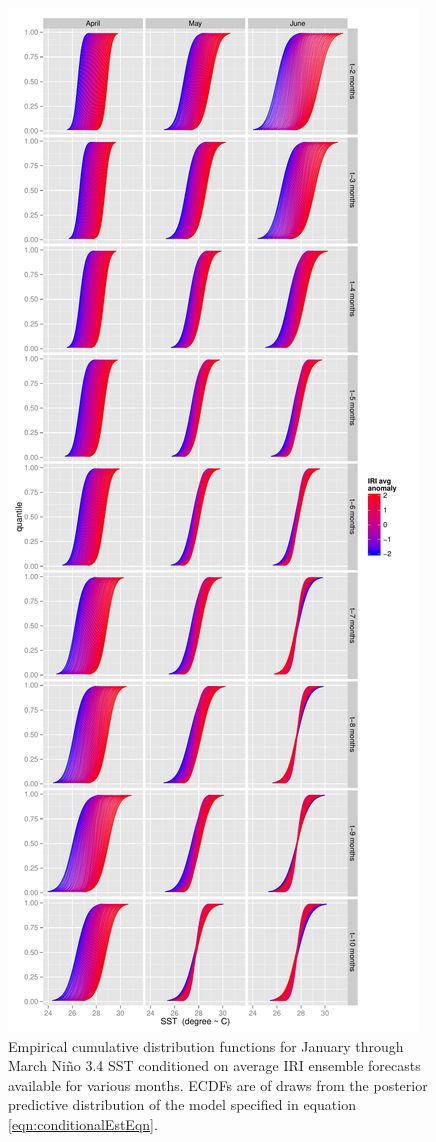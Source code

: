 \documentclass[authoryear]{article}
\begin{document}
\begin{figure}[!htbp]
  \includegraphics[width=\linewidth]{Pricingfigs/conditionalCDFs04to06TraditionalCDFconfig}
  \caption{Empirical cumulative distribution functions for January through March Ni\~no 3.4 SST conditioned on average IRI ensemble forecasts available for various months. ECDFs are of draws from the posterior predictive distribution of the model specified in equation \ref{eqn:conditionalEstEqn}.}
   \label{fig:conditionalCDFs01to03}
\end{figure}
\end{document}
